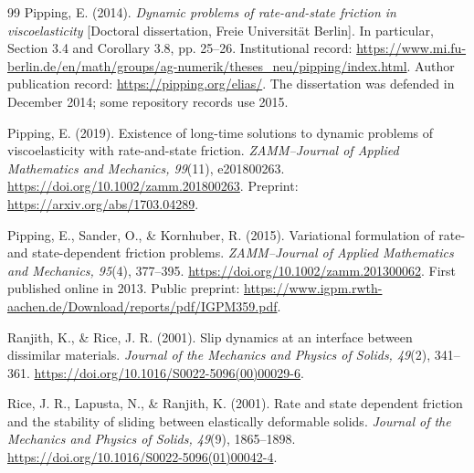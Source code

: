 \documentclass[11pt,a4paper]{article}
\theoremstyle{definition}\newtheorem{definition}[theorem]{Definition}
\theoremstyle{remark}\newtheorem{remark}[theorem]{Remark}
\numberwithin{equation}{section}
\begin{document}
\begin{thebibliography}{99}
Pipping, E. (2014).
\emph{Dynamic problems of rate-and-state friction in viscoelasticity}
[Doctoral dissertation, Freie Universit\"at Berlin].
In particular, Section 3.4 and Corollary 3.8, pp. 25--26.
Institutional record:
\url{https://www.mi.fu-berlin.de/en/math/groups/ag-numerik/theses_neu/pipping/index.html}.
Author publication record: \url{https://pipping.org/elias/}.
The dissertation was defended in December 2014; some repository records use 2015.

Pipping, E. (2019).
Existence of long-time solutions to dynamic problems of viscoelasticity with rate-and-state friction.
\emph{ZAMM--Journal of Applied Mathematics and Mechanics, 99}(11), e201800263.
\url{https://doi.org/10.1002/zamm.201800263}.
Preprint: \url{https://arxiv.org/abs/1703.04289}.

Pipping, E., Sander, O., \& Kornhuber, R. (2015).
Variational formulation of rate- and state-dependent friction problems.
\emph{ZAMM--Journal of Applied Mathematics and Mechanics, 95}(4), 377--395.
\url{https://doi.org/10.1002/zamm.201300062}.
First published online in 2013. Public preprint:
\url{https://www.igpm.rwth-aachen.de/Download/reports/pdf/IGPM359.pdf}.

Ranjith, K., \& Rice, J. R. (2001).
Slip dynamics at an interface between dissimilar materials.
\emph{Journal of the Mechanics and Physics of Solids, 49}(2), 341--361.
\url{https://doi.org/10.1016/S0022-5096(00)00029-6}.

Rice, J. R., Lapusta, N., \& Ranjith, K. (2001).
Rate and state dependent friction and the stability of sliding between elastically deformable solids.
\emph{Journal of the Mechanics and Physics of Solids, 49}(9), 1865--1898.
\url{https://doi.org/10.1016/S0022-5096(01)00042-4}.
\end{thebibliography}
\end{document}
